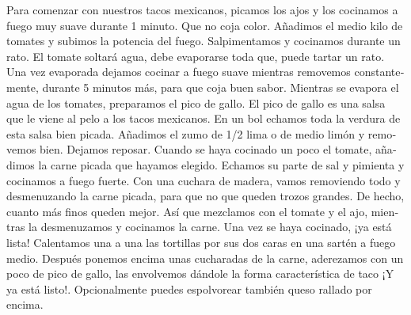 \begin{otherlanguage}{spanish}
\begin{recipe}
    \preparation
    { %
        \step Para comenzar con nuestros tacos mexicanos, picamos los ajos y los cocinamos a fuego muy suave durante 1 minuto. Que no coja color.
        \step Añadimos el medio kilo de tomates y subimos la potencia del fuego. Salpimentamos y cocinamos durante un rato. El tomate soltará agua, debe evaporarse toda que, puede tartar un rato. Una vez evaporada dejamos cocinar a fuego suave mientras removemos constantemente, durante 5 minutos más, para que coja buen sabor.
        \step Mientras se evapora el agua de los tomates, preparamos el pico de gallo. El pico de gallo es una salsa que le viene al pelo a los tacos mexicanos. En un bol echamos toda la verdura de esta salsa bien picada. Añadimos el zumo de 1/2 lima o de medio limón y removemos bien. Dejamos reposar.
        \step Cuando se haya cocinado un poco el tomate, añadimos la carne picada que hayamos elegido. Echamos su parte de sal y pimienta y cocinamos a fuego fuerte. Con una cuchara de madera, vamos removiendo todo y desmenuzando la carne picada, para que no que queden trozos grandes. De hecho, cuanto más finos queden mejor. Así que mezclamos con el tomate y el ajo, mientras la desmenuzamos y cocinamos la carne.
        \step Una vez se haya cocinado, ¡ya está lista! Calentamos una a una las tortillas por sus dos caras en una sartén a fuego medio. Después ponemos encima unas cucharadas de la carne, aderezamos con un poco de pico de gallo, las envolvemos dándole la forma característica de taco ¡Y ya está listo!. Opcionalmente puedes espolvorear también queso rallado por encima.
    }
    

\end{recipe}

\end{otherlanguage}

